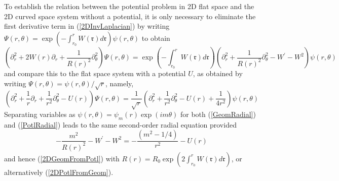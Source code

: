 \documentclass{article}%
\begin{document}
To establish the relation between the potential problem in 2D flat space and
the 2D curved space system without a potential, it is only necessary to
eliminate the first derivative term in (\ref{2DInvLaplacian}) by writing
$\Psi\left(  r,\theta\right)  =\exp\left(  -\int_{r_{0}}^{r}W\left(
\mathfrak{r}\right)  d\mathfrak{r}\right)  \psi\left(  r,\theta\right)  $ to
obtain%
\begin{equation}
\left(  \partial_{r}^{2}+2W\left(  r\right)  \partial_{r}+\frac{1}{R\left(
r\right)  ^{2}}\partial_{\theta}^{2}\right)  \Psi\left(  r,\theta\right)
=\exp\left(  -\int_{r_{0}}^{r}W\left(  \mathfrak{r}\right)  d\mathfrak{r}%
\right)  \left(  \partial_{r}^{2}+\frac{1}{R\left(  r\right)  ^{2}}%
\partial_{\theta}^{2}-W^{\prime}-W^{2}\right)  \psi\left(  r,\theta\right)
\label{GeomRadial}%
\end{equation}
and compare this to the flat space system with a potential $U$, as obtained by
writing $\Psi\left(  r,\theta\right)  =\psi\left(  r,\theta\right)  /\sqrt{r}%
$, namely,
\begin{equation}
\left(  \partial_{r}^{2}+\frac{1}{r}\partial_{r}+\frac{1}{r^{2}}%
\partial_{\theta}^{2}-U\left(  r\right)  \right)  \Psi\left(  r,\theta\right)
=\frac{1}{\sqrt{r}}\left(  \partial_{r}^{2}+\frac{1}{r^{2}}\partial_{\theta
}^{2}-U\left(  r\right)  +\frac{1}{4r^{2}}\right)  \psi\left(  r,\theta
\right)  \label{PotlRadial}%
\end{equation}
Separating variables as $\psi\left(  r,\theta\right)  =\psi_{m}\left(
r\right)  \exp\left(  im\theta\right)  $ for both (\ref{GeomRadial}) and
(\ref{PotlRadial}) leads to the same second-order radial equation provided%
\begin{equation}
-\frac{m^{2}}{R\left(  r\right)  ^{2}}-W^{\prime}-W^{2}=-\frac{\left(
m^{2}-1/4\right)  }{r^{2}}-U\left(  r\right)
\end{equation}
and hence (\ref{2DGeomFromPotl}) with $R\left(  r\right)  =R_{0}\exp\left(
2\int_{r_{0}}^{r}W\left(  \mathfrak{r}\right)  d\mathfrak{r}\right)  $, or
alternatively (\ref{2DPotlFromGeom}).
\end{document}
